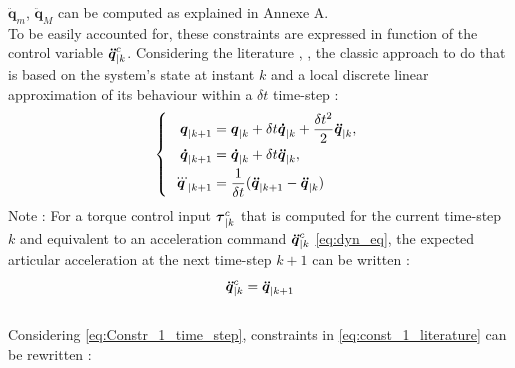 \documentclass[a4paper, 10pt, conference]{ieeeconf}      %
\newcommand{\vect}[1]{\mbox{\boldmath${#1}$}}%
\begin{document}
$\boldsymbol{\ddot{q}}_m$, $\boldsymbol{\ddot{q}}_M$ can be computed as explained in Annexe A.
\\
To be easily accounted for, these constraints are expressed in function of the control variable $\vect{\ddot{q}}_{|k}^{c}$. Considering the literature \cite{rubrecht2010constraints}, \cite{decre2009extending}, the classic approach to do that is based on the system's state at instant $k$ and a local discrete linear approximation of its behaviour within a $\delta t$ time-step :  
\begin{equation} 
\left\{\begin{array}{l}
\begin{split}
\vect{q}_{|k+1} & = \vect{q}_{|k} + \delta t \vect{\dot{q}}_{|k} + \frac{\delta t^{2}}{2} \vect{\ddot{q}}_{|k},\\
\vect{\dot{q}}_{|k+1} &  =  \vect{\dot{q}}_{|k} + \delta t \vect{\ddot{q}}_{|k},\\
\vect{\dddot{q}}_{|k+1} &  =  \frac{1}{\delta t} (\vect{\ddot{q}}_{|k+1} - \vect{\ddot{q}}_{|k})
\end{split}
\end{array}\right.
\label{eq:Constr_1_time_step}
\end{equation}
Note : For a torque control input $\vect{\tau}_{|k}^{c}$ that is computed for the current time-step $k$ and equivalent to an acceleration command $\vect{\ddot{q}}_{|k}^{c}$ \eqref{eq:dyn_eq}, the expected articular acceleration at the next time-step $k+1$ can be written : 
\begin{equation} 
\vect{\ddot{q}}_{|k}^{c}  = \vect{\ddot{q}}_{|k+1} 
\label{eq:cmd_input_dyn}
\end{equation}
\\
Considering \eqref{eq:Constr_1_time_step}, constraints in \eqref{eq:const_1_literature} can be rewritten : 
\end{document}
